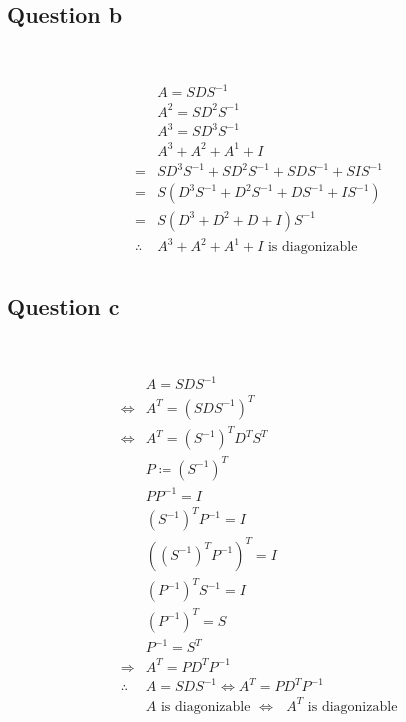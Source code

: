 \documentclass{article}
\begin{document}
\subsection{Question b}

~

\begin{equation*}
    \begin{split}
        &A=SDS^{-1}\\
        &A^2=SD^2S^{-1}\\
        &A^3=SD^3S^{-1}\\
        &A^3+A^2+A^1+I\\
        =&SD^3S^{-1}+SD^2S^{-1}+SDS^{-1}+SIS^{-1}\\
        =&S(D^3S^{-1}+D^2S^{-1}+DS^{-1}+IS^{-1})\\
        =&S(D^3+D^2+D+I)S^{-1}\\
        \therefore& A^3+A^2+A^1+I\text{ is diagonizable}\\
    \end{split}
\end{equation*}

\subsection{Question c}

~

\begin{equation*}
    \begin{split}
        &A=SDS^{-1}\\
        \Leftrightarrow &A^T=(SDS^{-1})^T\\
        \Leftrightarrow &A^T=(S^{-1})^TD^TS^T\\
        &P\coloneqq(S^{-1})^T\\
        &PP^{-1}=I\\
        &(S^{-1})^TP^{-1}=I\\
        &((S^{-1})^TP^{-1})^T=I\\
        &(P^{-1})^TS^{-1}=I\\
        &(P^{-1})^T=S\\
        &P^{-1}=S^T\\
        \Rightarrow&A^T=PD^TP^{-1}\\
        \therefore &A=SDS^{-1}\Leftrightarrow A^T=PD^TP^{-1}\\
        &A\text{ is diagonizable } \Leftrightarrow \text{ } A^T \text{ is diagonizable}
    \end{split}
\end{equation*}
\end{document}
